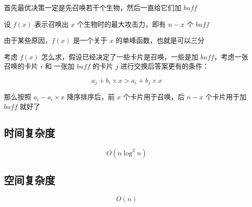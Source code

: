 \documentclass[UTF8]{article}
\begin{document}
首先最优决策一定是先召唤若干个生物，然后一直给它们加 $buff$

设 $f(x)$ 表示召唤出 $x$ 个生物时的最大攻击力，即有 $n-x$ 个 $buff$

由于某些原因，$f(x)$ 是一个关于 $x$ 的单峰函数，也就是可以三分

考虑 $f(x)$ 怎么求，假设已经决定了一些卡片是召唤，一些是加 $buff$，考虑一张召唤的卡片 $i$ 和 一张加 $buff$ 的卡片 $j$ 进行交换后答案更有的条件：

$$
a_j + b_i \times x > a_i + b_j \times x
$$

那么按照 $a_i-a_i \times x$ 降序排序后，前 $x$ 个卡片用于召唤，后 $n-x$ 个卡片用于加 $buff$ 就好了

\subsection{时间复杂度}

$$
O(n \log^2 n)
$$

\subsection{空间复杂度}

$$
O(n)
$$
\end{document}
